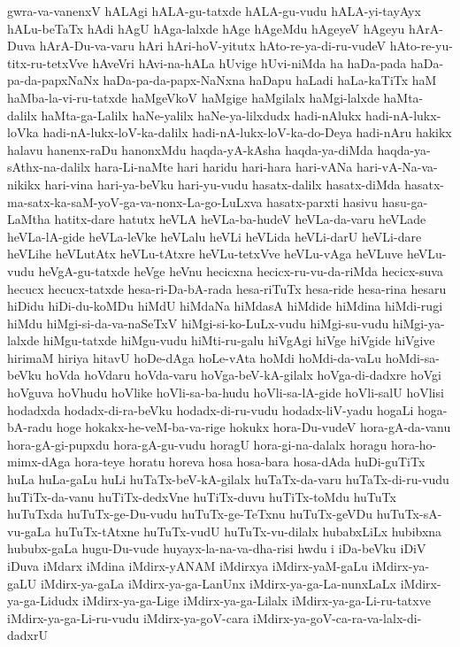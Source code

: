 {gwra-va-vanenxV
hALAgi
hALA-gu-tatxde
hALA-gu-vudu
hALA-yi-tayAyx
hALu-beTaTx
hAdi
hAgU
hAga-lalxde
hAge
hAgeMdu
hAgeyeV
hAgeyu
hArA-Duva
hArA-Du-va-varu
hAri
hAri-hoV-yitutx
hAto-re-ya-di-ru-vudeV
hAto-re-yu-titx-ru-tetxVve
hAveVri
hAvi-na-hALa
hUvige
hUvi-niMda
ha
haDa-pada
haDa-pa-da-papxNaNx
haDa-pa-da-papx-NaNxna
haDapu
haLadi
haLa-kaTiTx
haM
haMba-la-vi-ru-tatxde
haMgeVkoV
haMgige
haMgilalx
haMgi-lalxde
haMta-dalilx
haMta-ga-Lalilx
haNe-yalilx
haNe-ya-lilxdudx
hadi-nAlukx
hadi-nA-lukx-loVka
hadi-nA-lukx-loV-ka-dalilx
hadi-nA-lukx-loV-ka-do-Deya
hadi-nAru
hakikx
halavu
hanenx-raDu
hanonxMdu
haqda-yA-kAsha
haqda-ya-diMda
haqda-ya-sAthx-na-dalilx
hara-Li-naMte
hari
haridu
hari-hara
hari-vANa
hari-vA-Na-va-nikikx
hari-vina
hari-ya-beVku
hari-yu-vudu
hasatx-dalilx
hasatx-diMda
hasatx-ma-satx-ka-saM-yoV-ga-va-nonx-La-go-LuLxva
hasatx-parxti
hasivu
hasu-ga-LaMtha
hatitx-dare
hatutx
heVLA
heVLa-ba-hudeV
heVLa-da-varu
heVLade
heVLa-lA-gide
heVLa-leVke
heVLalu
heVLi
heVLida
heVLi-darU
heVLi-dare
heVLihe
heVLutAtx
heVLu-tAtxre
heVLu-tetxVve
heVLu-vAga
heVLuve
heVLu-vudu
heVgA-gu-tatxde
heVge
heVnu
hecicxna
hecicx-ru-vu-da-riMda
hecicx-suva
hecucx
hecucx-tatxde
hesa-ri-Da-bA-rada
hesa-riTuTx
hesa-ride
hesa-rina
hesaru
hiDidu
hiDi-du-koMDu
hiMdU
hiMdaNa
hiMdasA
hiMdide
hiMdina
hiMdi-rugi
hiMdu
hiMgi-si-da-va-naSeTxV
hiMgi-si-ko-LuLx-vudu
hiMgi-su-vudu
hiMgi-ya-lalxde
hiMgu-tatxde
hiMgu-vudu
hiMti-ru-galu
hiVgAgi
hiVge
hiVgide
hiVgive
hirimaM
hiriya
hitavU
hoDe-dAga
hoLe-vAta
hoMdi
hoMdi-da-vaLu
hoMdi-sa-beVku
hoVda
hoVdaru
hoVda-varu
hoVga-beV-kA-gilalx
hoVga-di-dadxre
hoVgi
hoVguva
hoVhudu
hoVlike
hoVli-sa-ba-hudu
hoVli-sa-lA-gide
hoVli-salU
hoVlisi
hodadxda
hodadx-di-ra-beVku
hodadx-di-ru-vudu
hodadx-liV-yadu
hogaLi
hoga-bA-radu
hoge
hokakx-he-veM-ba-va-rige
hokukx
hora-Du-vudeV
hora-gA-da-vanu
hora-gA-gi-pupxdu
hora-gA-gu-vudu
horagU
hora-gi-na-dalalx
horagu
hora-ho-mimx-dAga
hora-teye
horatu
horeva
hosa
hosa-bara
hosa-dAda
huDi-guTiTx
huLa
huLa-gaLu
huLi
huTaTx-beV-kA-gilalx
huTaTx-da-varu
huTaTx-di-ru-vudu
huTiTx-da-vanu
huTiTx-dedxVne
huTiTx-duvu
huTiTx-toMdu
huTuTx
huTuTxda
huTuTx-ge-Du-vudu
huTuTx-ge-TeTxnu
huTuTx-geVDu
huTuTx-sA-vu-gaLa
huTuTx-tAtxne
huTuTx-vudU
huTuTx-vu-dilalx
hubabxLiLx
hubibxna
hububx-gaLa
hugu-Du-vude
huyayx-la-na-va-dha-risi
hwdu
i
iDa-beVku
iDiV
iDuva
iMdarx
iMdina
iMdirx-yANAM
iMdirxya
iMdirx-yaM-gaLu
iMdirx-ya-gaLU
iMdirx-ya-gaLa
iMdirx-ya-ga-LanUnx
iMdirx-ya-ga-La-nunxLaLx
iMdirx-ya-ga-Lidudx
iMdirx-ya-ga-Lige
iMdirx-ya-ga-Lilalx
iMdirx-ya-ga-Li-ru-tatxve
iMdirx-ya-ga-Li-ru-vudu
iMdirx-ya-goV-cara
iMdirx-ya-goV-ca-ra-va-lalx-di-dadxrU
}
